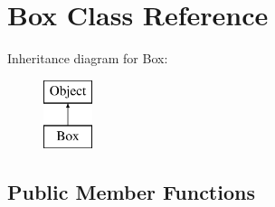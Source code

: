 \hypertarget{classBox}{}\section{Box Class Reference}
\label{classBox}
Inheritance diagram for Box\+:\begin{figure}[H]
\begin{center}
\leavevmode
\includegraphics[height=2.000000cm]{classBox}
\end{center}
\end{figure}
\subsection*{Public Member Functions}
